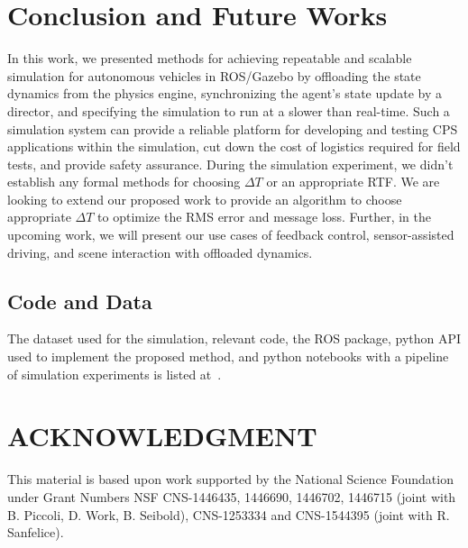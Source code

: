 \documentclass[aps,pra,twocolumn,notitlepage,nofootinbib,superscriptaddress]{revtex4-1}
\begin{document}
\section{Conclusion and Future Works}
\label{sec:conclusion}
In this work, we presented methods for achieving repeatable and scalable simulation for autonomous vehicles in ROS/Gazebo by offloading the state dynamics from the physics engine, synchronizing the agent's state update by a director, and specifying the simulation to run at a slower than real-time. Such a simulation system can provide a reliable platform for developing and testing CPS applications within the simulation, cut down the cost of logistics required for field tests, and provide safety assurance. During the simulation experiment, we didn't establish any formal methods for choosing $\Delta T$ or an appropriate RTF. We are looking to extend our proposed work to provide an algorithm to choose appropriate $\Delta T$ to optimize the RMS error and message loss. Further, in the upcoming work, we will present our use cases of feedback control, sensor-assisted driving, and scene interaction with offloaded dynamics.

\subsection*{Code and Data}
\label{sec:code}
The dataset used for the simulation, relevant code, the ROS package, python API used to implement the proposed method, and python notebooks with a pipeline of simulation experiments is listed at~\cite{sparkle}. 



\section*{\small ACKNOWLEDGMENT}
{
\footnotesize
This material is based upon work supported by the National Science Foundation under Grant Numbers NSF CNS-1446435, 1446690, 1446702, 1446715 (joint with B. Piccoli, D. Work, B. Seibold), CNS-1253334 
and  CNS-1544395 (joint with R. Sanfelice).
}



\end{document}
